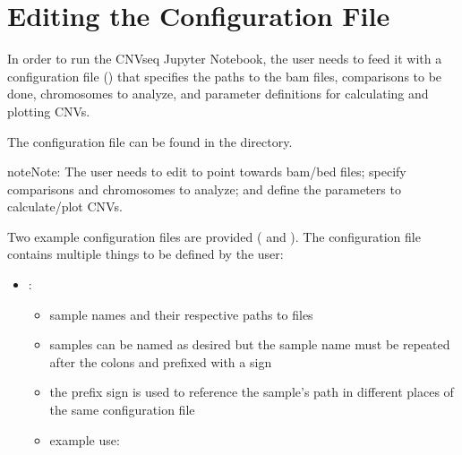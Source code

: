 \documentclass[letterpaper,10pt,english]{sphinxhowto}
\begin{document}
\section{Editing the Configuration File}
\label{\detokenize{index:editing-the-configuration-file}}
In order to run the CNV\sphinxhyphen{}seq Jupyter Notebook, the user needs to feed it with a configuration file () that specifies the paths to the bam files, comparisons to be done, chromosomes to analyze, and parameter definitions for calculating and plotting CNVs.

The configuration file  can be found in the  directory.

\begin{sphinxadmonition}{note}{Note:}
The user needs to edit  to point towards bam/bed files; specify comparisons and chromosomes to analyze; and define the parameters to calculate/plot CNVs.
\end{sphinxadmonition}

Two example configuration files are provided ( and ). The configuration file  contains multiple things to be defined by the user:
\begin{itemize}
\item {} 
:
\begin{itemize}
\item {} 
sample names and their respective paths to  files

\item {} 
samples can be named as desired but the sample name must be repeated after the colons and prefixed with a \sphinxtitleref{\&} sign

\item {} 
the \sphinxtitleref{\&} prefix sign is used to reference the sample’s path in different places of the same configuration file

\item {} 
example use:

\end{itemize}

\end{itemize}
\end{document}
